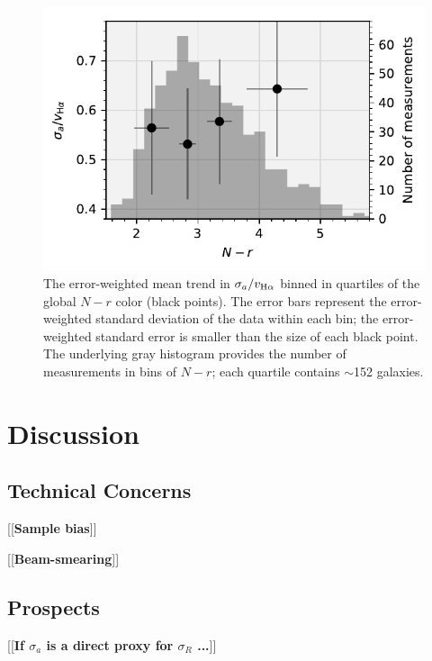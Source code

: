 \documentclass[apj,iop,revtex4,numberedappendix]{emulateapj}
\newcommand{\comment}[2][todo]{{\color{#1}[[{\bf #2}]]}}
\begin{document}

\begin{figure}
%
\begin{center}
%
\includegraphics[width=1.0\columnwidth]{figs/adov_vs_color.pdf}
%
\end{center}
%
\caption{
%
The error-weighted mean trend in $\sigma_a/v_{{\rm H}\alpha}$ binned in
quartiles of the global $N-r$ color (black points).  The error bars
represent the error-weighted standard deviation of the data within each
bin; the error-weighted standard error is smaller than the size of each
black point.  The underlying gray histogram provides the number of
measurements in bins of $N-r$; each quartile contains $\sim$152
galaxies.
%
}
%
\label{fig:colortrend}
%
\end{figure}

\section{Discussion}
\label{sec:discussion}

\subsection{Technical Concerns}

\comment{Sample bias}

\comment{Beam-smearing}

\subsection{Prospects}

\comment{If $\sigma_a$ is a direct proxy for $\sigma_R$ ...}


\end{document}
